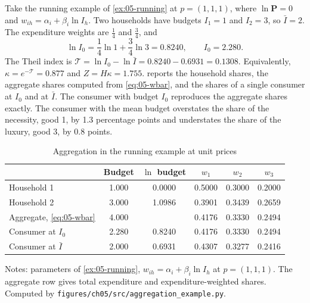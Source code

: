 \begin{example}\label{ex:05-aggregation}
Take the running example of \cref{ex:05-running} at $p = (1,1,1)$, where $\ln\mathbf{P} = 0$ and $w_{ih} =
\alpha_i + \beta_i\ln I_h$. Two households have budgets $I_1 = 1$ and $I_2 = 3$, so $\bar I = 2$. The
expenditure weights are $\frac{1}{4}$ and $\frac{3}{4}$, and
\begin{equation*}
  \ln I_0 = \frac{1}{4}\ln 1 + \frac{3}{4}\ln 3 = 0.8240, \qquad I_0 = 2.280 .
\end{equation*}
The Theil index is $\mathcal{T} = \ln I_0 - \ln\bar I = 0.8240 - 0.6931 = 0.1308$. Equivalently,
$\kappa = e^{-\mathcal{T}} = 0.877$ and $Z = H\kappa = 1.755$.  reports the
household shares, the aggregate shares computed from \eqref{eq:05-wbar}, and the shares of a single
consumer at $I_0$ and at $\bar I$. The consumer with budget $I_0$ reproduces the aggregate shares
exactly. The consumer with the mean budget overstates the share of the necessity, good 1, by 1.3
percentage points and understates the share of the luxury, good 3, by 0.8 points.
\end{example}

\begin{table}[htbp]
\centering
\caption{Aggregation in the running example at unit prices}
\label{tab:05-agg-example}
\begin{tabular}{lccccc}
\toprule
 & Budget & $\ln$ budget & $w_1$ & $w_2$ & $w_3$ \\
\midrule
Household 1 & 1.000 & 0.0000 & 0.5000 & 0.3000 & 0.2000 \\
Household 2 & 3.000 & 1.0986 & 0.3901 & 0.3439 & 0.2659 \\
Aggregate, \eqref{eq:05-wbar} & 4.000 & & 0.4176 & 0.3330 & 0.2494 \\
Consumer at $I_0$ & 2.280 & 0.8240 & 0.4176 & 0.3330 & 0.2494 \\
Consumer at $\bar I$ & 2.000 & 0.6931 & 0.4307 & 0.3277 & 0.2416 \\
\bottomrule
\end{tabular}

\smallskip
\begin{minipage}{0.82\textwidth}
\footnotesize Notes: parameters of \cref{ex:05-running}, $w_{ih} = \alpha_i + \beta_i\ln I_h$ at $p =
(1,1,1)$. The aggregate row gives total expenditure and expenditure-weighted shares. Computed by
\texttt{figures/ch05/src/aggregation\_example.py}.
\end{minipage}
\end{table}

